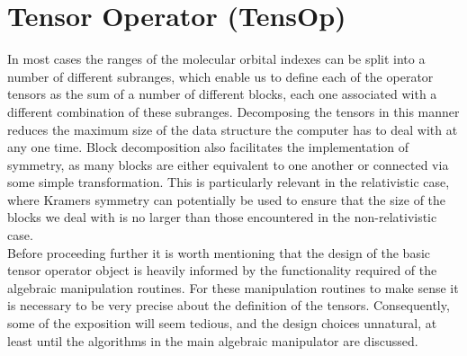 \documentclass[12pt]{article}
\begin{document}
\section{Tensor Operator (TensOp)}
In most cases the ranges of the molecular orbital indexes can be split into a
number of different subranges, which enable us to define each of the operator
tensors as the sum of a number of different blocks, each one associated with a
different combination of these subranges. Decomposing the tensors in this
manner reduces the maximum size of the data structure the computer has to deal
with at any one time. Block decomposition also facilitates the implementation
of symmetry, as many blocks are either equivalent to one another or connected
via some simple transformation. This is particularly relevant in the
relativistic case, where Kramers symmetry can potentially be used to ensure
that the size of the blocks we deal with is no larger than those encountered in
the non-relativistic case.\\

\noindent Before proceeding further it is worth mentioning that the design of
the basic tensor operator object is heavily informed by the functionality
required of the algebraic manipulation routines. For these manipulation 
routines to make sense it is necessary to be very precise about the 
definition of the tensors. Consequently, some of the exposition will 
seem tedious, and the design choices unnatural, at least until the algorithms in the main algebraic
manipulator are discussed.\\ 
\end{document}
